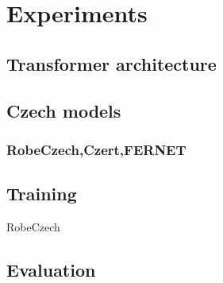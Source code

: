 \chapter{Experiments}

\section{Transformer architecture}
\section{Czech models}
\subsection{RobeCzech,Czert,FERNET}
\section{Training}
RobeCzech \cite{thorne2019fever2}
\section{Evaluation}
